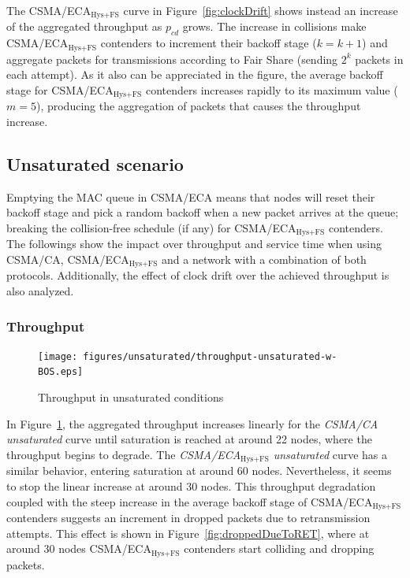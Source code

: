 \documentclass[a4paper,journal]{IEEEtran}
\begin{document}
	The CSMA/ECA$_{\text{Hys+FS}}$ curve in Figure~\ref{fig:clockDrift} shows instead an increase of the aggregated throughput as $p_{cd}$ grows. The increase in collisions make CSMA/ECA$_{\text{Hys+FS}}$ contenders to increment their backoff stage ($k=k+1$) and aggregate packets for transmissions according to Fair Share (sending $2^{k}$ packets in each attempt). As it also can be appreciated in the figure, the average backoff stage for CSMA/ECA$_{\text{Hys+FS}}$ contenders increases rapidly to its maximum value ($m=5$), producing the aggregation of packets that causes the throughput increase.


	\subsection{Unsaturated scenario}\label{resultsUnsaturated}
	Emptying the MAC queue in CSMA/ECA means that nodes will reset their backoff stage and pick a random backoff when a new packet arrives at the queue; breaking the collision-free schedule (if any)  for CSMA/ECA$_{\text{Hys+FS}}$ contenders. The followings show the impact over throughput and service time when using CSMA/CA, CSMA/ECA$_{\text{Hys+FS}}$ and a network with a combination of both protocols. Additionally, the effect of clock drift over the achieved throughput is also analyzed.\\
	
	\subsubsection{Throughput}
	
   	\begin{figure}[htbp]
		\centering
		\texttt{[image: figures/unsaturated/throughput-unsaturated-w-BOS.eps]}
		\caption{Throughput in unsaturated conditions}
		\label{fig:throughputUnsat}
	\end{figure}
	
	In Figure~\ref{fig:throughputUnsat}, the aggregated throughput increases linearly for the \emph{CSMA/CA unsaturated} curve until saturation is reached at around 22 nodes, where the throughput begins to degrade. The \emph{CSMA/ECA$_{\text{Hys+FS}}$ unsaturated} curve has a similar behavior, entering saturation at around 60 nodes. Nevertheless, it seems to stop the linear increase at around 30 nodes. This throughput degradation coupled with the steep increase in the average backoff stage of CSMA/ECA$_{\text{Hys+FS}}$ contenders suggests an increment in dropped packets due to retransmission attempts. This effect is shown in Figure~\ref{fig:droppedDueToRET}, where at around 30 nodes CSMA/ECA$_{\text{Hys+FS}}$ contenders start colliding and dropping packets. 
	
\end{document}
